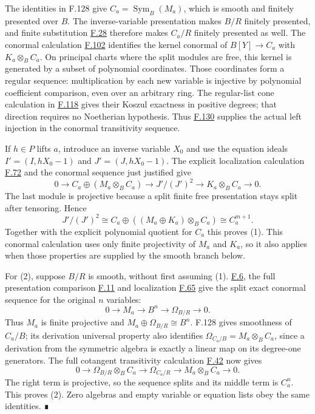 \documentclass[11pt,a4paper,openany]{report}
\begin{document}
The identities in F.128 give \(C_a=\operatorname{Sym}_B(M_a)\), which is smooth and finitely presented over \(B\). The inverse-variable presentation makes \(B/R\) finitely presented, and finite substitution \hyperref[AG-RG-S05-algebra-lemma-compose-finite-type]{F.28} therefore makes \(C_a/R\) finitely presented as well. The conormal calculation \hyperref[AG-RG-S05-more-algebra-lemma-cotangent-complex-symmetric-algebra]{F.102} identifies the kernel conormal of \(B[Y]\to C_a\) with \(K_a\otimes_B C_a\). On principal charts where the split modules are free, this kernel is generated by a subset of polynomial coordinates. Those coordinates form a regular sequence: multiplication by each new variable is injective by polynomial coefficient comparison, even over an arbitrary ring. The regular-list cone calculation in \hyperref[AG-RG-S05-more-algebra-lemma-noetherian-finite-all-equivalent]{F.118} gives their Koszul exactness in positive degrees; that direction requires no Noetherian hypothesis. Thus \hyperref[AG-RG-S05-more-algebra-lemma-transitive-lci-at-end]{F.130} supplies the actual left injection in the conormal transitivity sequence.

If \(h\in P\) lifts \(a\), introduce an inverse variable \(X_0\) and use the equation ideals \(I'=(I,hX_0-1)\) and \(J'=(J,hX_0-1)\). The explicit localization calculation \hyperref[AG-RG-S05-algebra-lemma-principal-localization-NL]{F.72} and the conormal sequence just justified give \[0\longrightarrow C_a\oplus(M_a\otimes_B C_a)\longrightarrow J'/(J')^2\longrightarrow K_a\otimes_B C_a\longrightarrow0.\] The last module is projective because a split finite free presentation stays split after tensoring. Hence \[J'/(J')^2\cong C_a\oplus((M_a\oplus K_a)\otimes_B C_a)\cong C_a^{m+1}.\] Together with the explicit polynomial quotient for \(C_a\) this proves (1). This conormal calculation uses only finite projectivity of \(M_a\) and \(K_a\), so it also applies when those properties are supplied by the smooth branch below.

For (2), suppose \(B/R\) is smooth, without first assuming (1). \hyperref[AG-RG-S05-algebra-definition-smooth]{F.6}, the full presentation comparison \hyperref[AG-RG-S05-algebra-lemma-NL-homotopy]{F.11} and localization \hyperref[AG-RG-S05-algebra-lemma-localize-NL]{F.65} give the split exact conormal sequence for the original \(n\) variables: \[0\longrightarrow M_a\longrightarrow B^n\longrightarrow\Omega_{B/R}\longrightarrow0.\] Thus \(M_a\) is finite projective and \(M_a\oplus\Omega_{B/R}\cong B^n\). F.128 gives smoothness of \(C_a/B\); its derivation universal property also identifies \(\Omega_{C_a/B}=M_a\otimes_B C_a\), since a derivation from the symmetric algebra is exactly a linear map on its degree-one generators. The full cotangent transitivity calculation \hyperref[AG-RG-S05-algebra-lemma-exact-sequence-NL]{F.42} now gives \[0\longrightarrow\Omega_{B/R}\otimes_B C_a\longrightarrow\Omega_{C_a/R}\longrightarrow M_a\otimes_B C_a\longrightarrow0.\] The right term is projective, so the sequence splits and its middle term is \(C_a^n\). This proves (2). Zero algebras and empty variable or equation lists obey the same identities. ∎
\end{document}
